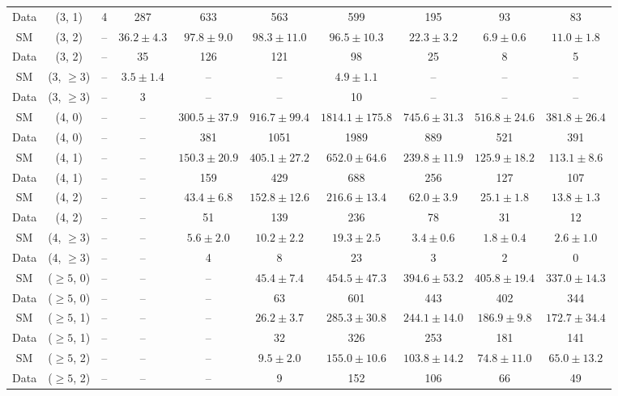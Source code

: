 \begin{table}[h!]
{\begin{tabular}{cccccccccc}
	Data & (3, 1) & 4 & 287 & 633 & 563 & 599 & 195 & 93 & 83 \\[0.5ex] 
	SM & (3, 2) & -- & $36.2\pm 4.3$ & $97.8\pm 9.0$ & $98.3\pm 11.0$ & $96.5\pm 10.3$ & $22.3\pm 3.2$ & $6.9\pm 0.6$ & $11.0\pm 1.8$ \\[0.5ex] 
	Data & (3, 2) & -- & 35 & 126 & 121 & 98 & 25 & 8 & 5 \\[0.5ex] 
	SM & (3, $\ge3$) & -- & $3.5\pm 1.4$ & -- & -- & $4.9\pm 1.1$ & -- & -- & -- \\[0.5ex] 
	Data & (3, $\ge3$) & -- & 3 & -- & -- & 10 & -- & -- & -- \\[0.5ex] 
	SM & (4, 0) & -- & -- & $300.5\pm 37.9$ & $916.7\pm 99.4$ & $1814.1\pm 175.8$ & $745.6\pm 31.3$ & $516.8\pm 24.6$ & $381.8\pm 26.4$ \\[0.5ex] 
	Data & (4, 0) & -- & -- & 381 & 1051 & 1989 & 889 & 521 & 391 \\[0.5ex] 
	SM & (4, 1) & -- & -- & $150.3\pm 20.9$ & $405.1\pm 27.2$ & $652.0\pm 64.6$ & $239.8\pm 11.9$ & $125.9\pm 18.2$ & $113.1\pm 8.6$ \\[0.5ex] 
	Data & (4, 1) & -- & -- & 159 & 429 & 688 & 256 & 127 & 107 \\[0.5ex] 
	SM & (4, 2) & -- & -- & $43.4\pm 6.8$ & $152.8\pm 12.6$ & $216.6\pm 13.4$ & $62.0\pm 3.9$ & $25.1\pm 1.8$ & $13.8\pm 1.3$ \\[0.5ex] 
	Data & (4, 2) & -- & -- & 51 & 139 & 236 & 78 & 31 & 12 \\[0.5ex] 
	SM & (4, $\ge3$) & -- & -- & $5.6\pm 2.0$ & $10.2\pm 2.2$ & $19.3\pm 2.5$ & $3.4\pm 0.6$ & $1.8\pm 0.4$ & $2.6\pm 1.0$ \\[0.5ex] 
	Data & (4, $\ge3$) & -- & -- & 4 & 8 & 23 & 3 & 2 & 0 \\[0.5ex] 
	SM & ($\ge5$, 0) & -- & -- & -- & $45.4\pm 7.4$ & $454.5\pm 47.3$ & $394.6\pm 53.2$ & $405.8\pm 19.4$ & $337.0\pm 14.3$ \\[0.5ex] 
	Data & ($\ge5$, 0) & -- & -- & -- & 63 & 601 & 443 & 402 & 344 \\[0.5ex] 
	SM & ($\ge5$, 1) & -- & -- & -- & $26.2\pm 3.7$ & $285.3\pm 30.8$ & $244.1\pm 14.0$ & $186.9\pm 9.8$ & $172.7\pm 34.4$ \\[0.5ex] 
	Data & ($\ge5$, 1) & -- & -- & -- & 32 & 326 & 253 & 181 & 141 \\[0.5ex] 
	SM & ($\ge5$, 2) & -- & -- & -- & $9.5\pm 2.0$ & $155.0\pm 10.6$ & $103.8\pm 14.2$ & $74.8\pm 11.0$ & $65.0\pm 13.2$ \\[0.5ex] 
	Data & ($\ge5$, 2) & -- & -- & -- & 9 & 152 & 106 & 66 & 49 \\[0.5ex] 

\end{tabular}}
\end{table}
